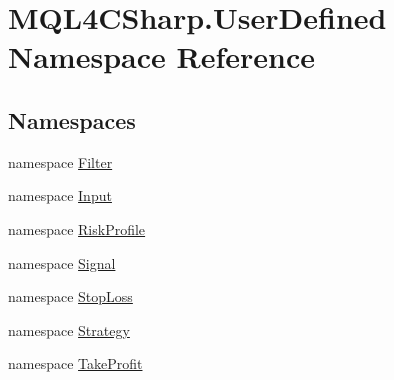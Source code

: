 \hypertarget{namespace_m_q_l4_c_sharp_1_1_user_defined}{}\section{M\+Q\+L4\+C\+Sharp.\+User\+Defined Namespace Reference}
\label{namespace_m_q_l4_c_sharp_1_1_user_defined}
\subsection*{Namespaces}
\begin{DoxyCompactItemize}
\item 
namespace \hyperlink{namespace_m_q_l4_c_sharp_1_1_user_defined_1_1_filter}{Filter}
\item 
namespace \hyperlink{namespace_m_q_l4_c_sharp_1_1_user_defined_1_1_input}{Input}
\item 
namespace \hyperlink{namespace_m_q_l4_c_sharp_1_1_user_defined_1_1_risk_profile}{Risk\+Profile}
\item 
namespace \hyperlink{namespace_m_q_l4_c_sharp_1_1_user_defined_1_1_signal}{Signal}
\item 
namespace \hyperlink{namespace_m_q_l4_c_sharp_1_1_user_defined_1_1_stop_loss}{Stop\+Loss}
\item 
namespace \hyperlink{namespace_m_q_l4_c_sharp_1_1_user_defined_1_1_strategy}{Strategy}
\item 
namespace \hyperlink{namespace_m_q_l4_c_sharp_1_1_user_defined_1_1_take_profit}{Take\+Profit}
\end{DoxyCompactItemize}
